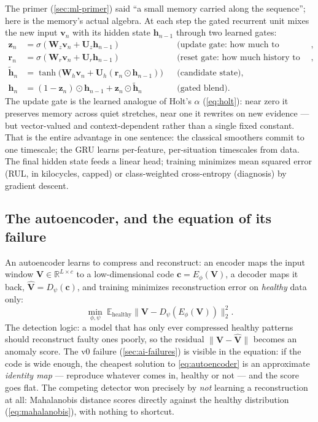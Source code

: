The primer (\cref{sec:ml-primer}) said ``a small memory carried along the sequence''; here
is the memory's actual algebra. At each step the gated recurrent unit mixes the new input
$\mathbf{v}_n$ with its hidden state $\mathbf{h}_{n-1}$ through two learned gates:
\begin{align}
  \mathbf{z}_n &= \sigma(\mathbf{W}_z \mathbf{v}_n + \mathbf{U}_z \mathbf{h}_{n-1}) 
    &&\text{(update gate: how much to rewrite)}, \nonumber\\
  \mathbf{r}_n &= \sigma(\mathbf{W}_r \mathbf{v}_n + \mathbf{U}_r \mathbf{h}_{n-1})
    &&\text{(reset gate: how much history to consult)}, \nonumber\\
  \tilde{\mathbf{h}}_n &= \tanh\bigl(\mathbf{W}_h \mathbf{v}_n + \mathbf{U}_h (\mathbf{r}_n \odot \mathbf{h}_{n-1})\bigr)
    &&\text{(candidate state)}, \nonumber\\
  \mathbf{h}_n &= (1 - \mathbf{z}_n) \odot \mathbf{h}_{n-1} + \mathbf{z}_n \odot \tilde{\mathbf{h}}_n
    &&\text{(gated blend)}.
  \label{eq:gru}
\end{align}
The update gate is the learned analogue of Holt's $\alpha$ (\cref{eq:holt}): near zero it
preserves memory across quiet stretches, near one it rewrites on new evidence --- but
vector-valued and context-dependent rather than a single fixed constant. That is the
entire advantage in one sentence: the classical smoothers commit to one timescale;
the GRU learns per-feature, per-situation timescales from data. The final hidden state
feeds a linear head; training minimizes mean squared error (RUL, in kilocycles, capped)
or class-weighted cross-entropy (diagnosis) by gradient descent.

\subsection{The autoencoder, and the equation of its failure}
\label{sec:math-ae}

An autoencoder learns to compress and reconstruct: an encoder maps the input window
$\mathbf{V} \in \mathbb{R}^{L \times c}$ to a low-dimensional code
$\mathbf{c} = E_\phi(\mathbf{V})$, a decoder maps it back,
$\hat{\mathbf{V}} = D_\psi(\mathbf{c})$, and training minimizes reconstruction error on
\emph{healthy} data only:
\begin{equation}
  \min_{\phi, \psi}\ \mathbb{E}_{\text{healthy}}
  \bigl\|\mathbf{V} - D_\psi(E_\phi(\mathbf{V}))\bigr\|_2^2 .
  \label{eq:autoencoder}
\end{equation}
The detection logic: a model that has only ever compressed healthy patterns should
reconstruct faulty ones poorly, so the residual
$\|\mathbf{V} - \hat{\mathbf{V}}\|$ becomes an anomaly score. The v0 failure
(\cref{sec:ai-failures}) is visible in the equation: if the code is wide enough, the
cheapest solution to \cref{eq:autoencoder} is an approximate \emph{identity map} ---
reproduce whatever comes in, healthy or not --- and the score goes flat. The competing
detector won precisely by \emph{not} learning a reconstruction at all: Mahalanobis
distance scores directly against the healthy distribution (\cref{eq:mahalanobis}), with
nothing to shortcut.


